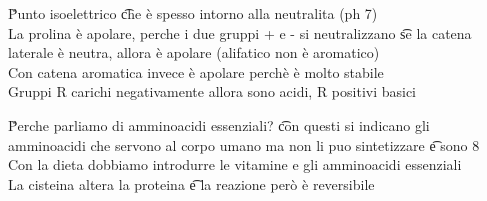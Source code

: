 \documentclass[12pt]{article}
\begin{document}
\v

Punto isoelettrico \t che è spesso intorno alla neutralita (ph 7) \\
La prolina è apolare, perche i due gruppi + e - si neutralizzano \t se la catena laterale è neutra, allora è apolare (alifatico non è aromatico) \\
Con catena aromatica invece è apolare perchè è molto stabile \\
Gruppi R carichi negativamente allora sono acidi, R positivi basici

\v

Perche parliamo di amminoacidi essenziali? \t con questi si indicano gli amminoacidi che servono al corpo umano ma non li puo sintetizzare \t e sono 8 \\
Con la dieta dobbiamo introdurre le vitamine e gli amminoacidi essenziali \\
La cisteina altera la proteina \t e la reazione però è reversibile
\end{document}

